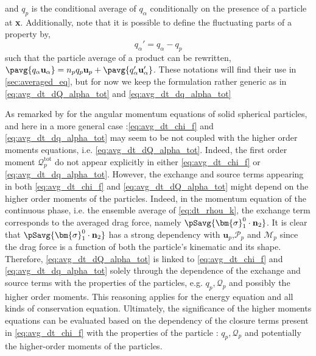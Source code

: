 and $q_p$ is the conditional average of $q_\alpha$ conditionally on the presence of a particle at \textbf{x}. 
Additionally, note that it is possible to define the fluctuating parts of a property by, 
\begin{equation}
    q_\alpha' = q_\alpha - q_p
\end{equation}
such that the particle average of a product can be rewritten, $\pavg{q_\alpha\textbf{u}_\alpha} = n_p q_p \textbf{u}_p + \pavg{q_\alpha' \textbf{u}_\alpha'}$. 
These notations will find their use in \ref{sec:averaged_eq}, but for now we keep the formulation rather generic as in \ref{eq:avg_dt_dQ_alpha_tot} and \ref{eq:avg_dt_dq_alpha_tot}

As remarked by \citet{jackson1997locally} for the angular momentum equations of solid spherical particles, and here in a more general case :\ref{eq:avg_dt_chi_f} and \ref{eq:avg_dt_dq_alpha_tot} may seem to be not coupled with the higher order moments equations, i.e. \ref{eq:avg_dt_dQ_alpha_tot}. 
Indeed, the first order moment $\mathcal{Q}_p^\text{tot}$ do not appear explicitly in either \ref{eq:avg_dt_chi_f} or \ref{eq:avg_dt_dq_alpha_tot}.
However, the exchange and source terms 
appearing in both \ref{eq:avg_dt_chi_f} and \ref{eq:avg_dt_dQ_alpha_tot} might depend on the higher order moments of the particles.
Indeed, in the momentum equation of the continuous phase, i.e. the ensemble average of \ref{eq:dt_rhou_k}, the exchange term corresponds to the averaged drag force, namely $\pSavg{\bm{\sigma}_1^0\cdot \textbf{n}_2}$. 
It is clear that $\pSavg{\bm{\sigma}_1^0\cdot \textbf{n}_2}$ has a strong dependency with $\textbf{u}_p$,$\mathcal{P}_p$ and $\mathcal{M}_p$ since the drag force is a function of both the particle's kinematic and its shape. 
Therefore, \ref{eq:avg_dt_dQ_alpha_tot} is linked to \ref{eq:avg_dt_chi_f} and \ref{eq:avg_dt_dq_alpha_tot} solely through the dependence of the exchange and source terms with the properties of the particles, e.g. $q_p,\mathcal{Q}_p$ and possibly the higher order moments. 
This reasoning applies for the energy equation and all kinds of conservation equation. 
Ultimately, the significance of the higher moments equations can be evaluated based on the dependency of the closure terms present in \ref{eq:avg_dt_chi_f} with the properties of the particle : $q_p, \mathcal{Q}_p$ and potentially the higher-order moments of the particles. 

